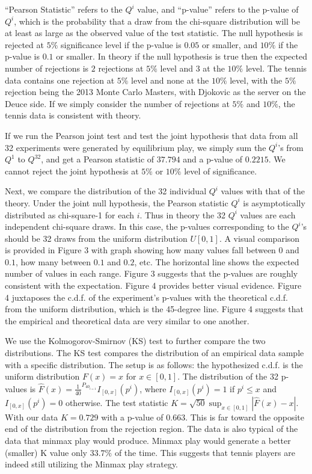 \documentclass[11pt]{article}
\begin{document}
“Pearson Statistic” refers to the $Q^i$ value, and “p-value” refers to the p-value of $Q^i$, which is the probability that a draw from the chi-square distribution will be at least as large as the observed value of the test statistic. The null hypothesis is rejected at $5\%$ significance level if the p-value is $0.05$ or smaller, and $10\%$ if the p-value is $0.1$ or smaller. In theory if the null hypothesis is true then the expected number of rejections is $2$ rejections at $5\%$ level and $3$ at the $10\%$ level. The tennis data contains one rejection at $5\%$ level and none at the $10\%$ level, with the $5\%$ rejection being the 2013 Monte Carlo Masters, with Djokovic as the server on the Deuce side. If we simply consider the number of rejections at $5\%$ and $10\%$, the tennis data is consistent with theory. 

If we run the Pearson joint test and test the joint hypothesis that data from all 32 experiments were generated by equilibrium play, we simply sum the $Q^i$’s from $Q^1$ to $Q^{32}$, and get a Pearson statistic of $37.794$ and a p-value of $0.2215$. We cannot reject the joint hypothesis at $5\%$ or $10\%$ level of significance. 

Next, we compare the distribution of the 32 individual $Q^i$ values with that of the theory. Under the joint null hypothesis, the Pearson statistic $Q^i$ is asymptotically distributed as chi-square-1 for each $i$. Thus in theory the 32 $Q^i$ values are each independent chi-square draws. In this case, the p-values corresponding to the $Q^i$’s should be 32 draws from the uniform distribution $U[0,1]$. A visual comparison is provided in Figure 3 with graph showing how many values fall between $0$ and $0.1$, how many between $0.1$ and $0.2$, etc.  The horizontal line shows the expected number of values in each range. Figure 3 suggests that the p-values are roughly consistent with the expectation. Figure 4 provides better visual evidence. Figure 4 juxtaposes the c.d.f. of the experiment’s p-values with the theoretical c.d.f. from the uniform distribution, which is the 45-degree line. Figure 4 suggests that the empirical and theoretical data are very similar to one another.

We use the Kolmogorov-Smirnov (KS) test to further compare the two distributions. The KS test compares the distribution of an empirical data sample with a specific distribution. The setup is as follows: the hypothesized c.d.f. is the uniform distribution $F(x)=x$ for $x \in [0,1]$. The distribution of the 32 p-values is $\hat{F}(x)=\frac{1}{40}^{P_{40_{i=1}}}I_{[0,x]}(p^i)$, where $I_{[0,x]}(p^i) = 1$ if $p^i \leq x$ and $I_{[0,x]}(p^i) = 0$ otherwise. The test statistic $K=\sqrt{50}\sup_{x\in [0,1]} |\hat{F}(x) -x |$. With our data $K=0.729$ with a p-value of $0.663$. This is far toward the opposite end of the distribution from the rejection region. The data is also typical of the data that minmax play would produce. Minmax play would generate a better (smaller) K value only $33.7\%$ of the time. This suggests that tennis players are indeed still utilizing the Minmax play strategy.
\end{document}
